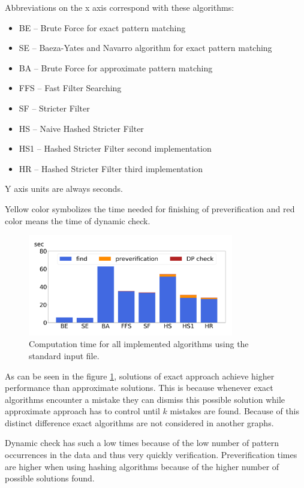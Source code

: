 Abbreviations on the x axis correspond with these algorithms:
\begin{itemize}
\item BE -- Brute Force for exact pattern matching
\item SE -- Baeza-Yates and Navarro algorithm for exact pattern matching
\item BA -- Brute Force for approximate pattern matching
\item FFS -- Fast Filter Searching
\item SF -- Stricter Filter
\item HS -- Naive Hashed Stricter Filter
\item HS1 -- Hashed Stricter Filter second implementation
\item HR -- Hashed Stricter Filter third implementation
\end{itemize}

Y axis units are always seconds.

Yellow color symbolizes the time needed for finishing of preverification and red color means the time of dynamic check.

\begin{figure}[h]
\centering
\includegraphics[width=0.8\textwidth]{img/baseAll}
\caption{Computation time for all implemented algorithms using the standard input file.}
\label{fig_compT}
\end{figure}

As can be seen in the figure \ref{fig_compT}, solutions of exact approach achieve higher performance than approximate solutions. This is because whenever exact algorithms encounter a mistake they can dismiss this possible solution while approximate approach has to control until $k$ mistakes are found. Because of this distinct difference exact algorithms are not considered in another graphs.

Dynamic check has such a low times because of the low number of pattern occurrences in the data and thus very quickly verification. Preverification times are higher when using hashing algorithms because of the higher number of possible solutions found.

